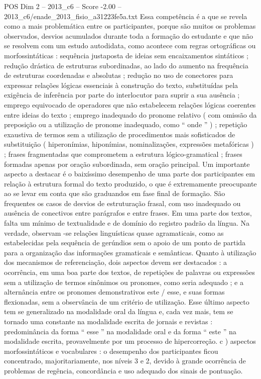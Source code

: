 \begin{textsample}{POS Dim 2 – 2013\_c6 – Score -2.00 – 2013\_c6/enade\_2013\_fisio\_a31223fe5a.txt}
Essa competência é a que se revela como a mais problemática entre os participantes, porque são muitos os problemas observados, desvios acumulados durante toda a formação do estudante e que não se resolvem com um estudo autodidata, como acontece com regras ortográficas ou morfossintáticas : sequência justaposta de ideias sem encaixamentos sintáticos ; redução drástica de estruturas subordinadas, ao lado do aumento na frequência de estruturas coordenadas e absolutas ; redução no uso de conectores para expressar relações lógicas essenciais à construção do texto, substituídas pela exigência de inferência por parte do interlocutor para suprir a sua ausência ; emprego equivocado de operadores que não estabelecem relações lógicas coerentes entre ideias do texto ; emprego inadequado do pronome relativo ( com omissão da preposição ou a utilização de pronome inadequado, como “ onde ” ) ; repetição exaustiva de termos sem a utilização de procedimentos mais sofisticados de substituição ( hiperonímias, hiponímias, nominalizações, expressões metafóricas ) ; frases fragmentadas que comprometem a estrutura lógico-gramatical ; frases formadas apenas por oração subordinada, sem oração principal.
Um importante aspecto a destacar é o baixíssimo desempenho de uma parte dos participantes em relação à estrutura formal do texto produzido, o que é extremamente preocupante ao se levar em conta que são graduandos em fase final de formação.
São frequentes os casos de desvios de estruturação frasal, com uso inadequado ou ausência de conectivos entre parágrafos e entre frases.
Em uma parte dos textos, falta um mínimo de textualidade e de domínio do registro padrão da língua.
Na verdade, observam -se relações linguísticas quase agramaticais, como as estabelecidas pela sequência de gerúndios sem o apoio de um ponto de partida para a organização das informações gramaticais e semânticas.
Quanto à utilização dos mecanismos de referenciação, dois aspectos devem ser destacados : a ocorrência, em uma boa parte dos textos, de repetições de palavras ou expressões sem a utilização de termos sinônimos ou pronomes, como seria adequado ; e a alternância entre os pronomes demonstrativos este / esse, e suas formas flexionadas, sem a observância de um critério de utilização.
Esse último aspecto tem se generalizado na modalidade oral da língua e, cada vez mais, tem se tornado uma constante na modalidade escrita de jornais e revistas : predominância da forma “ esse ” na modalidade oral e da forma “ este ” na modalidade escrita, provavelmente por um processo de hipercorreção. c ) aspectos morfossintáticos e vocabulares : o desempenho dos participantes ficou concentrado, majoritariamente, nos níveis 3 e 2, devido à grande ocorrência de problemas de regência, concordância e uso adequado dos sinais de pontuação.

\end{textsample}
